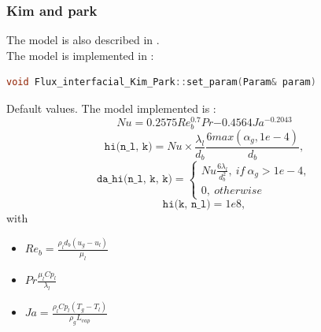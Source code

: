\subsubsection{Kim and park}
The model is also described in \cite{}.\\
The model is implemented in :
\begin{lstlisting}[language=c++]
void Flux_interfacial_Kim_Park::set_param(Param& param)
\end{lstlisting}
Default values.
The model implemented is :
\begin{equation}
         Nu = 0.2575 Re_b^{0.7}Pr{ -0.4564}Ja^{-0.2043}
\end{equation}
\begin{equation}
    \texttt{hi(n_l, k)} = Nu \times\frac{\lambda_l}{d_b} \frac{6max(\alpha_g,1e-4)}{d_b},
\end{equation}
\begin{equation}
\texttt{da\_hi(n_l, k, k)} = \begin{cases}
    Nu \frac{6\lambda_l}{d_b^2},\ if\ \alpha_g> 1e-4,\\ 0,\ otherwise
\end{cases}
\end{equation}
\begin{equation}
\texttt{hi(k, n_l)} = 1e8,
\end{equation}
with
\begin{itemize}
    \item[\small \textcolor{blue}{\ding{109}}]$Re_b=\frac{\rho_l d_b (u_g-u_l)}{\mu_l}$
    \item[\small \textcolor{blue}{\ding{109}}]$Pr\frac{\mu_l Cp_l}{\lambda_l}$
    \item[\small \textcolor{blue}{\ding{109}}]$Ja=\frac{\rho_lCp_l(T_g-T_l)}{\rho_gL_{vap}}$
\end{itemize}

